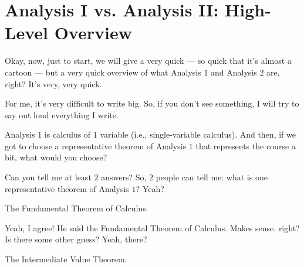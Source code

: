 \begin{ai-global-state-checkpoint-invisible-content}
\end{ai-global-state-checkpoint-invisible-content}

\section{Analysis I vs. Analysis II: High-Level Overview}

\begin{spoken-clean}[00:05:07 - 00:07:22]
Okay, now, just to start, we will give a very quick --- so quick that it's almost a cartoon --- but a very quick overview of what Analysis $1$ and Analysis $2$ are, right? It's very, very quick.

For me, it's very difficult to write big. So, if you don't see something, I will try to say out loud everything I write.

Analysis $1$ is calculus of $1$ variable (i.e., single-variable calculus). And then, if we got to choose a representative theorem of Analysis $1$ that represents the course a bit, what would you choose?

Can you tell me at least $2$ answers? So, $2$ people can tell me: what is one representative theorem of Analysis $1$? Yeah?
\end{spoken-clean}

\begin{student-interaction}
The Fundamental Theorem of Calculus.
\end{student-interaction}

\begin{spoken-clean}[00:07:22 - 00:08:35]
Yeah, I agree! He said the Fundamental Theorem of Calculus. Makes sense, right? Is there some other guess? Yeah, there?
\end{spoken-clean}

\begin{student-interaction}
The Intermediate Value Theorem.
\end{student-interaction}

